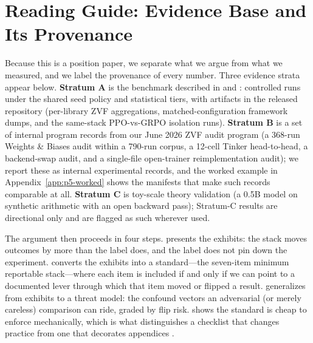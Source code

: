 \section{Reading Guide: Evidence Base and Its Provenance}
\label{sec:p5-results}
Because this is a position paper, we separate what we argue from what we
measured, and we label the provenance of every number. Three evidence strata
appear below. \textbf{Stratum A} is the \ours{} benchmark described in
 and : controlled runs under the shared
seed policy and statistical tiers, with artifacts in the released repository
(per-library ZVF aggregations, matched-configuration framework dumps, and the
same-stack PPO-vs-GRPO isolation runs). \textbf{Stratum B} is a set of internal
program records from our June 2026 ZVF audit program (a 368-run Weights \&
Biases audit within a 790-run corpus, a 12-cell Tinker head-to-head, a
backend-swap audit, and a single-file open-trainer reimplementation audit); we
report these as internal experimental records, and the worked example in
Appendix~\ref{app:p5-worked} shows the manifests that make such records
comparable at all. \textbf{Stratum C} is toy-scale theory validation (a 0.5B
model on synthetic arithmetic with an open backward pass); Stratum-C results are
directional only and are flagged as such wherever used.

The argument then proceeds in four steps.  presents the
exhibits: the stack moves outcomes by more than the label does, and the label
does not pin down the experiment.  converts the exhibits
into a standard---the seven-item minimum reportable stack---where each item is
included if and only if we can point to a documented lever through which that
item moved or flipped a result.  generalizes from
exhibits to a threat model: the confound vectors an adversarial (or merely
careless) comparison can ride, graded by flip risk. 
shows the standard is cheap to enforce mechanically, which is what
distinguishes a checklist that changes practice from one that decorates
appendices \citep{pineau2020improving}.
